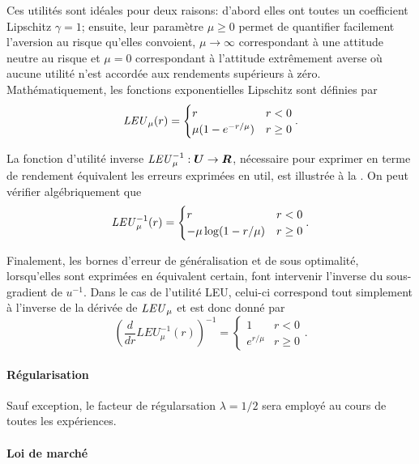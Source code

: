 Ces utilités sont idéales pour deux raisons: d'abord elles ont toutes un coefficient
Lipschitz $\gamma = 1$; ensuite, leur paramètre $\mu\geq0$ permet de quantifier facilement
l'aversion au risque qu'elles convoient, $\mu \to \infty$ correspondant à une attitude neutre au
risque et $\mu = 0$ correspondant à l'attitude extrêmement averse où aucune utilité n'est
accordée aux rendements supérieurs à zéro. Mathématiquement, les fonctions exponentielles
Lipschitz sont définies par
\begin{equation}
  \mbox{\textit{LEU}}_\mu(r) = 
  \begin{cases}
    r & r<0\\
    \mu(1-e^{-r/\mu}) & r\geq 0
  \end{cases}.
\end{equation}

La fonction d'utilité inverse $\mbox{\textit{LEU}}_\mu^{-1}:\bm{U}\to\bm{R}$, nécessaire pour exprimer en terme de
rendement équivalent les erreurs exprimées en util, est illustrée à la
. On peut vérifier algébriquement que
\begin{equation}
  \mbox{\textit{LEU}}_\mu^{-1}(r) =
  \begin{cases}
    r & r<0\\
    -\mu\log(1-r/\mu) & r\geq 0
  \end{cases}.
\end{equation}

Finalement, les bornes d'erreur de généralisation et de sous optimalité, lorsqu'elles sont
exprimées en équivalent certain, font intervenir l'inverse du sous-gradient de
$u^{-1}$. Dans le cas de l'utilité LEU, celui-ci correspond tout simplement à l'inverse de
la dérivée de $\mbox{\textit{LEU}}_\mu$ et est donc donné par
\begin{equation}
  \left(\frac{d}{dr} LEU^{-1}_\mu(r)\right)^{-1} = 
  \begin{cases}
    1 & r<0\\
    e^{r/\mu} & r\geq 0
  \end{cases}.
\end{equation}


\paragraph{Régularisation}

Sauf exception, le facteur de régularsation $\lambda = 1/2$ sera employé au cours de toutes les
expériences. 



\paragraph{Loi de marché}

